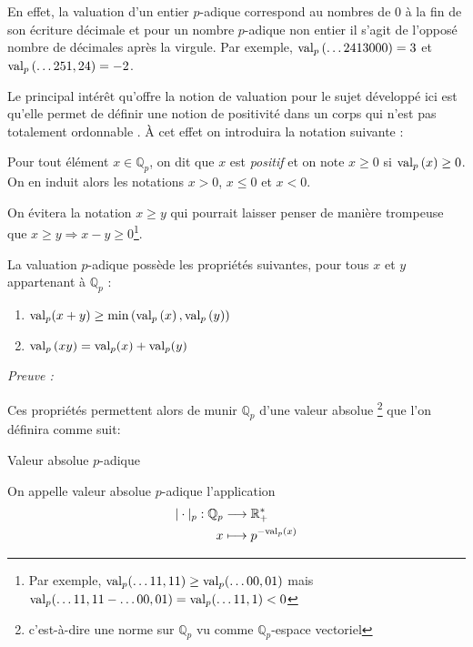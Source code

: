 En effet, la valuation d'un entier $p$-adique correspond au nombres de $0$ à la fin de son écriture décimale  et pour un nombre $p$-adique non entier il s'agit de l'opposé nombre de décimales  après la virgule. Par exemple, $\text{val}_p\left( \ldots 2413000 \right) = 3$ et $\text{val}_p\left( \ldots 251,24 \right) = -2$.       

Le principal intérêt qu'offre la notion de valuation pour le sujet développé ici est qu'elle permet de définir une notion de positivité dans un corps qui n'est pas totalement ordonnable . À cet effet on introduira la notation suivante :
\begin{notation}
	Pour tout élément $x \in \mathbb{Q}_{p} $, on dit que $x$ est \textit{positif} et on note $x\ge 0$ si $\text{val}_p\left(x\right)\ge 0$. On en induit alors les notations $x> 0$, $x\le 0$ et $x<0$.  
\end{notation}

        On évitera la notation $x\ge y$ qui pourrait laisser penser de manière trompeuse que $x\ge y \Rightarrow x-y\ge 0$\footnote{Par exemple, $\text{val}_p(\ldots11,11) \ge \text{val}_p(\ldots00,01) $ mais $\text{val}_p(\ldots11,11 - \ldots00,01) = \text{val}_p( \ldots 11,1) < 0$}.

\begin{propriete}
	La valuation $p$-adique possède les propriétés suivantes, pour tous $x$ et $y$ appartenant à $\mathbb{Q}_{p} $ :   
	\begin{enumerate}
		\item $\text{val}_p(x+y) \ge \min\left( \text{val}_p\left( x \right), \text{val}_p\left( y \right)  \right) $ 
		\item $\text{val}_p\left( xy \right) = \text{val}_p (x) + \text{val}_p( y)$ 
	\end{enumerate}
\end{propriete}
\textit{Preuve :}   

Ces propriétés permettent alors de munir $\mathbb{Q}_{p} $ d'une valeur absolue \footnote{c'est-à-dire une norme sur $\mathbb{Q}_{p} $ vu comme $\mathbb{Q}_{p} $-espace vectoriel} que l'on définira comme suit:

\begin{definition} Valeur absolue $p$-adique

	On appelle valeur absolue $p$-adique l'application 
\begin{align*}
|\cdot|_p : \mathbb{Q}_{p} & \longrightarrow \mathbb{R}^*_+\\
x & \longmapsto p^{-\text{val}_p\left(x\right)} 
\end{align*}
\end{definition}

